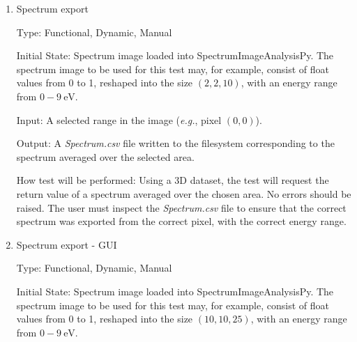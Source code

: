 \documentclass[12pt, titlepage]{article}
\newcommand{\progname}{SpectrumImageAnalysisPy}
\begin{document}
\begin{enumerate}
Type: Functional, Dynamic, Manual

Initial State: Spectrum image loaded into \progname{}. The spectrum image to be
used for this test may, for example, consist of float values from 0 to 1,
reshaped into the size $(10,10,25)$, with an energy range from $0-9\
\si{\electronvolt}$.

Input: The user must interact with the GUI to select an energy range in the
spectrum from which to create and export an image.

Output: An \textit{Image.png} image written to the filesystem corresponding to
the image averaged over the selected spectrum energy range.

How test will be performed: Using a 3D dataset, the test will display the GUI
and ask the user to select an energy range in the spectrum and run the command
to export an image to file. The user must inspect the \textit{Image.png} file to
ensure that the correct spectrum was exported from the correct pixel.\\

\item{Spectrum export}
\label{TFR:SpecExport}

Type: Functional, Dynamic, Manual

Initial State: Spectrum image loaded into \progname{}. The spectrum image to be
used for this test may, for example, consist of float values from 0 to 1,
reshaped into the size $(2,2,10)$, with an energy range from $0-9\
\si{\electronvolt}$.

Input: A selected range in the image (\textit{e.g.}, pixel $(0,0)$).

Output: A \textit{Spectrum.csv} file written to the filesystem corresponding to
the spectrum averaged over the selected area.

How test will be performed: Using a 3D dataset, the test will request the return
value of a spectrum averaged over the chosen area. No errors should be raised.
The user must inspect the \textit{Spectrum.csv} file to ensure that the correct
spectrum was exported from the correct pixel, with the correct energy range.

\item{Spectrum export - GUI}
\label{TFR:SpecExportGUI}

Type: Functional, Dynamic, Manual

Initial State: Spectrum image loaded into \progname{}. The spectrum image to be
used for this test may, for example, consist of float values from 0 to 1,
reshaped into the size $(10,10,25)$, with an energy range from $0-9\
\si{\electronvolt}$.


\end{enumerate}
\end{document}
